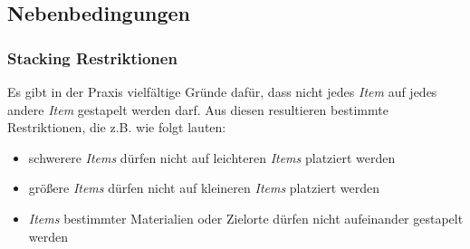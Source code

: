 \subsection{Nebenbedingungen}
\label{sec:constraints}

\subsubsection{Stacking Restriktionen}
\label{sec:stacking_restrictions}

Es gibt in der Praxis vielfältige Gründe dafür, dass nicht jedes \textit{Item} auf jedes andere \textit{Item} gestapelt werden darf.
Aus diesen resultieren bestimmte Restriktionen, die z.B. wie folgt lauten:
\begin{itemize}
  \item schwerere \textit{Items} dürfen nicht auf leichteren \textit{Items} platziert werden
  \item größere \textit{Items} dürfen nicht auf kleineren \textit{Items} platziert werden
  \item \textit{Items} bestimmter Materialien oder Zielorte dürfen nicht aufeinander gestapelt werden
\end{itemize}

